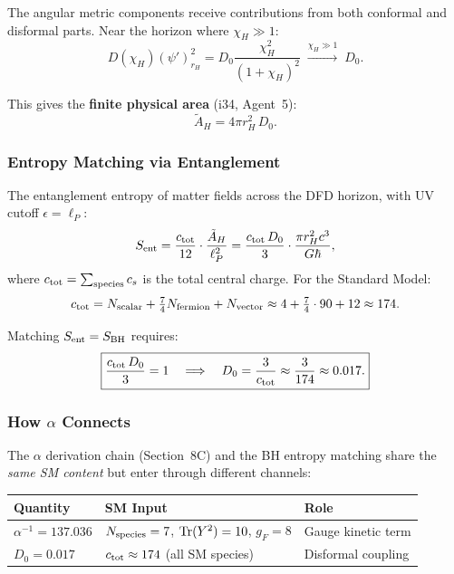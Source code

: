 \documentclass[11pt,a4paper]{article}
\begin{document}
The angular metric components receive contributions from both conformal and disformal parts. Near the horizon where $\chi_H \gg 1$:
\begin{equation}
D(\chi_H)(\psi')^2_{r_H} = D_0\frac{\chi_H^2}{(1+\chi_H)^2} \;\xrightarrow{\chi_H \gg 1}\; D_0.
\end{equation}

This gives the \textbf{finite physical area} (i34, Agent~5):
\begin{equation}\label{eq:Atilde}
\boxed{\tilde{A}_H = 4\pi r_H^2\,D_0.}
\end{equation}

\subsubsection{Entropy Matching via Entanglement}

The entanglement entropy of matter fields across the DFD horizon, with UV cutoff $\epsilon = \ell_P$:
\begin{equation}\label{eq:Sent}
S_{\rm ent} = \frac{c_{\rm tot}}{12}\cdot\frac{\tilde{A}_H}{\ell_P^2} = \frac{c_{\rm tot}\,D_0}{3}\cdot\frac{\pi r_H^2 c^3}{G\hbar},
\end{equation}
where $c_{\rm tot} = \sum_{\rm species} c_s$ is the total central charge. For the Standard Model:
\begin{equation}
c_{\rm tot} = N_{\rm scalar} + \tfrac{7}{4}N_{\rm fermion} + N_{\rm vector} \approx 4 + \tfrac{7}{4}\cdot 90 + 12 \approx 174.
\end{equation}

Matching $S_{\rm ent} = S_{\rm BH}$ requires:
\begin{equation}\label{eq:D0-condition}
\boxed{\frac{c_{\rm tot}\,D_0}{3} = 1 \quad\Longrightarrow\quad D_0 = \frac{3}{c_{\rm tot}} \approx \frac{3}{174} \approx 0.017.}
\end{equation}

\subsubsection{How $\alpha$ Connects}

The $\alpha$ derivation chain (Section~8C) and the BH entropy matching share the \emph{same SM content} but enter through different channels:

\begin{center}
\begin{tabular}{lll}
\toprule
\textbf{Quantity} & \textbf{SM Input} & \textbf{Role} \\
\midrule
$\alpha^{-1} = 137.036$ & $N_{\rm species} = 7$, ${\rm Tr}(Y^2) = 10$, $g_F = 8$ & Gauge kinetic term \\
$D_0 = 0.017$ & $c_{\rm tot} \approx 174$ (all SM species) & Disformal coupling \\
\bottomrule
\end{tabular}
\end{center}
\end{document}
